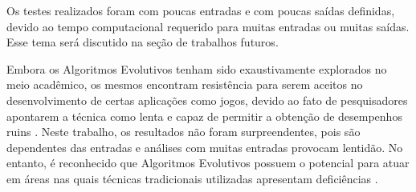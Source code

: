 Os testes realizados foram com poucas entradas e com poucas saídas definidas, devido ao tempo computacional requerido para muitas entradas ou muitas saídas. Esse tema será discutido na seção de trabalhos futuros.

Embora os Algoritmos Evolutivos tenham sido exaustivamente explorados no meio acadêmico, os mesmos encontram resistência para serem aceitos no desenvolvimento de certas aplicações como jogos, devido ao fato de pesquisadores apontarem a técnica como lenta e capaz de permitir a obtenção de desempenhos ruins \cite{Sweetser2002} \cite{Spronck2003} \cite{Marcio2008}. Neste trabalho, os resultados não foram surpreendentes, pois são dependentes das entradas e análises com muitas entradas provocam lentidão. No entanto, é reconhecido que Algoritmos Evolutivos possuem o potencial para atuar em áreas nas quais técnicas tradicionais utilizadas apresentam deficiências \cite{YANNAKAKIS2005}.